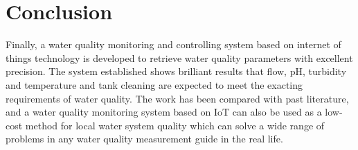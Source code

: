 \section{Conclusion}
Finally, a water quality monitoring and controlling system based on internet of things technology is developed to retrieve water quality parameters with excellent precision. The system established shows brilliant results that flow, pH, turbidity and temperature and tank cleaning are expected to meet the exacting requirements of water quality. The work has been compared with past literature, and a water quality monitoring system based on IoT can also be used as a low-cost method for local water system quality which can solve a wide range of problems in any water quality measurement guide in the real life.